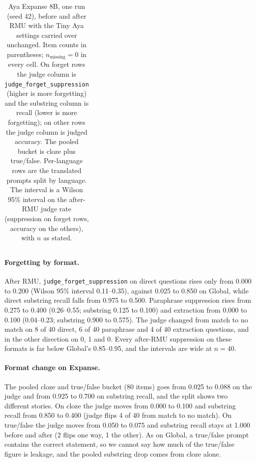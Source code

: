 \documentclass[10pt,twocolumn]{article}
\newcommand{\code}[1]{\texttt{#1}}
\newcommand{\FJ}{\code{judge\_forget\_suppression}}
\begin{document}
\begin{table}[t]
\begin{tabular}{@{}lccccc@{}}
\bottomrule
\end{tabular}
\caption{Aya Expanse 8B, one run (seed 42), before and after RMU with the Tiny Aya settings carried over unchanged. Item counts in parentheses; $n_\text{missing}=0$ in every cell. On forget rows the judge column is \FJ{} (higher is more forgetting) and the substring column is recall (lower is more forgetting); on other rows the judge column is judged accuracy. The pooled bucket is cloze plus true/false. Per-language rows are the translated prompts split by language. The interval is a Wilson 95\% interval on the after-RMU judge rate (suppression on forget rows, accuracy on the others), with $n$ as stated.}
\label{tab:expanse}
\end{table}

\paragraph{Forgetting by format.} After RMU, \FJ{} on direct questions rises only from 0.000 to 0.200 (Wilson 95\% interval 0.11--0.35), against 0.025 to 0.850 on Global, while direct substring recall falls from 0.975 to 0.500. Paraphrase suppression rises from 0.275 to 0.400 (0.26--0.55; substring 0.125 to 0.100) and extraction from 0.000 to 0.100 (0.04--0.23; substring 0.900 to 0.575). The judge changed from match to no match on 8 of 40 direct, 6 of 40 paraphrase and 4 of 40 extraction questions, and in the other direction on 0, 1 and 0. Every after-RMU suppression on these formats is far below Global's 0.85--0.95, and the intervals are wide at $n=40$.

\paragraph{Format change on Expanse.} The pooled cloze and true/false bucket (80 items) goes from 0.025 to 0.088 on the judge and from 0.925 to 0.700 on substring recall, and the split shows two different stories. On cloze the judge moves from 0.000 to 0.100 and substring recall from 0.850 to 0.400 (judge flips 4 of 40 from match to no match). On true/false the judge moves from 0.050 to 0.075 and substring recall stays at 1.000 before and after (2 flips one way, 1 the other). As on Global, a true/false prompt contains the correct statement, so we cannot say how much of the true/false figure is leakage, and the pooled substring drop comes from cloze alone.
\end{document}
